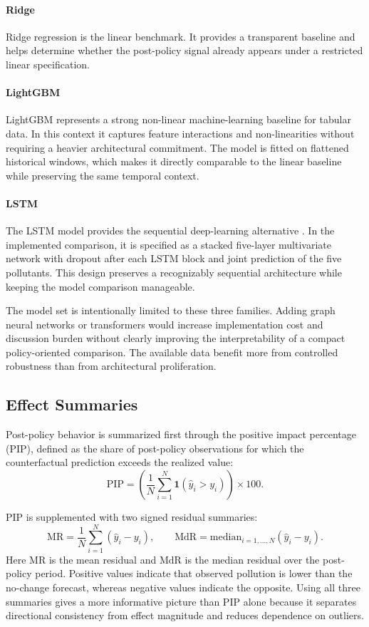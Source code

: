 \paragraph{\textbf{Ridge}}
Ridge regression is the linear benchmark. It provides a transparent baseline and helps determine whether the post-policy signal already appears under a restricted linear specification.

\paragraph{\textbf{LightGBM}}
LightGBM represents a strong non-linear machine-learning baseline for tabular data. In this context it captures feature interactions and non-linearities without requiring a heavier architectural commitment. The model is fitted on flattened historical windows, which makes it directly comparable to the linear baseline while preserving the same temporal context.

\paragraph{\textbf{LSTM}}
The LSTM model provides the sequential deep-learning alternative \cite{10.1162/neco.1997.9.8.1735}. In the implemented comparison, it is specified as a stacked five-layer multivariate network with dropout after each LSTM block and joint prediction of the five pollutants. This design preserves a recognizably sequential architecture while keeping the model comparison manageable.

The model set is intentionally limited to these three families. Adding graph neural networks or transformers would increase implementation cost and discussion burden without clearly improving the interpretability of a compact policy-oriented comparison. The available data benefit more from controlled robustness than from architectural proliferation.

\subsection{Effect Summaries}

Post-policy behavior is summarized first through the positive impact percentage (PIP), defined as the share of post-policy observations for which the counterfactual prediction exceeds the realized value:
\[
\mathrm{PIP} = \left( \frac{1}{N} \sum_{i=1}^{N} \mathbf{1}(\hat{y}_i > y_i) \right) \times 100.
\]

PIP is supplemented with two signed residual summaries:
\[
\mathrm{MR} = \frac{1}{N} \sum_{i=1}^{N} (\hat{y}_i - y_i),
\qquad
\mathrm{MdR} = \mathrm{median}_{i=1,\ldots,N} (\hat{y}_i - y_i).
\]
Here $\mathrm{MR}$ is the mean residual and $\mathrm{MdR}$ is the median residual over the post-policy period. Positive values indicate that observed pollution is lower than the no-change forecast, whereas negative values indicate the opposite. Using all three summaries gives a more informative picture than PIP alone because it separates directional consistency from effect magnitude and reduces dependence on outliers.
